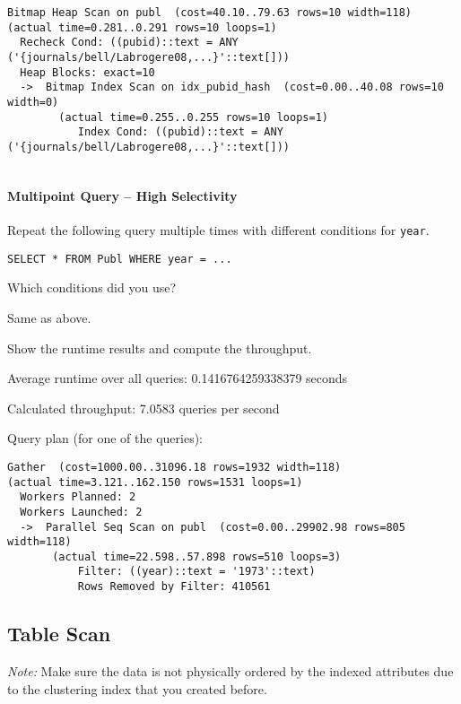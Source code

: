 \documentclass[11pt]{scrartcl}
\begin{document}
{\small
\parskip0pt\begin{verbatim}
Bitmap Heap Scan on publ  (cost=40.10..79.63 rows=10 width=118) 
(actual time=0.281..0.291 rows=10 loops=1)
  Recheck Cond: ((pubid)::text = ANY ('{journals/bell/Labrogere08,...}'::text[]))
  Heap Blocks: exact=10
  ->  Bitmap Index Scan on idx_pubid_hash  (cost=0.00..40.08 rows=10 width=0) 
        (actual time=0.255..0.255 rows=10 loops=1)
           Index Cond: ((pubid)::text = ANY ('{journals/bell/Labrogere08,...}'::text[]))
 
\end{verbatim}}

\paragraph{Multipoint Query -- High Selectivity}

Repeat the following query multiple times with different conditions for \texttt{year}.

\begin{lstlisting}[style=dbtsql]
SELECT * FROM Publ WHERE year = ...
\end{lstlisting}

Which conditions did you use?

Same as above.

Show the runtime results and compute the throughput.

Average runtime over all queries: 0.1416764259338379 seconds

Calculated throughput: 7.0583 queries per second

Query plan (for one of the queries):

{\small
\parskip0pt\begin{verbatim}
Gather  (cost=1000.00..31096.18 rows=1932 width=118) 
(actual time=3.121..162.150 rows=1531 loops=1)
  Workers Planned: 2
  Workers Launched: 2
  ->  Parallel Seq Scan on publ  (cost=0.00..29902.98 rows=805 width=118) 
       (actual time=22.598..57.898 rows=510 loops=3)
           Filter: ((year)::text = '1973'::text)
           Rows Removed by Filter: 410561
\end{verbatim}}

\subsection*{Table Scan}

\emph{Note:} Make sure the data is not physically ordered by the indexed attributes due to the clustering index that you created before.
\end{document}
